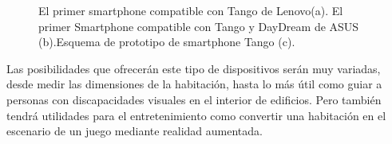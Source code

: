 \begin{figure}[htbp]
\begin{center}
\hspace{0.5cm}
\hspace{0.5cm}
\hspace{0.5cm}
\end{center}
\caption{El primer smartphone compatible con Tango de Lenovo(a). El primer Smartphone compatible con Tango y DayDream de ASUS (b).Esquema de prototipo de smartphone Tango (c).}
\end{figure}
Las posibilidades que ofrecerán este tipo de dispositivos serán muy variadas, desde medir las dimensiones de la habitación, hasta lo más útil como guiar a personas con discapacidades visuales en el interior de edificios. Pero también tendrá utilidades para el entretenimiento como convertir una habitación en el escenario de un juego mediante realidad aumentada.

